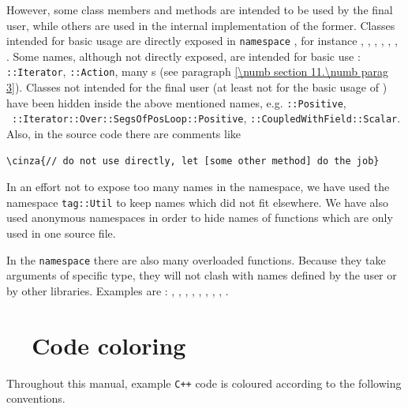 However, some class members and methods are intended to be used by the final user,
while others are used in the internal implementation of the former.
Classes \hbox{intended} for basic usage are directly exposed in {\small\tt namespace}
{\small\tt{}}, for instance
{\small\tt{}}, {\small\tt{}},
{\small\tt{}}, {\small\tt{}}, {\small\tt{}},
{\small\tt{}}, {\small\tt{}}.
Some names, although not directly exposed, are intended for basic use :
{\small\tt{}::Iterator}, {\small\tt{}::Action},
many {\small\tt{}}s (see paragraph \ref{\numb section 11.\numb parag 3}).
Classes not intended for the final user (at least not for the basic usage of \maniFEM)
have been hidden inside the above mentioned names, e.g. {\small\tt{}::Positive},
\ {\small\tt{}::Iterator::Over::SegsOfPosLoop::Positive},
\hbox{\small\tt{}::CoupledWithField::Scalar}.
Also, in the source code there are comments like

\begin{Verbatim}[commandchars=\\\{\},formatcom=\small\tt,baselinestretch=0.94]
   \cinza{// do not use directly, let [some other method] do the job}
\end{Verbatim}

In an effort not to expose too many names in the {\small\tt{}} namespace, we have
used the namespace {\small\tt\textcolor{tag}{tag}::Util} to keep names which did not fit elsewhere.
We have also used anonymous namespaces in order to hide names of functions which are
only used in one source file.

In the {\small\tt namespace} {\small\tt{}} there are also many overloaded functions.
Because they take arguments of specific type, they will not clash with names defined
by the user or by other libraries.
Examples are : {\small\tt{}}, {\small\tt{}}, {\small\tt{}},
{\small\tt{}}, {\small\tt{}}, {\small\tt{}}, {\small\tt{}},
{\small\tt{}}, {\small\tt{}}.


\section{~~Code coloring}\label{\numb section 11.\numb parag 2}

Throughout this manual, example {\tt C++} code is coloured according to the following
conventions.

